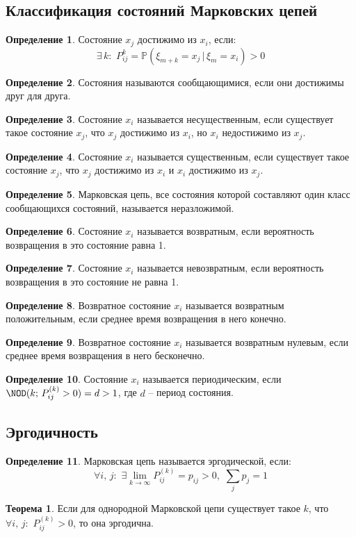 \documentclass[12pt]{article}
\theoremstyle{definition}
\newtheorem{theorem}{Теорема}[section]
\newtheorem{definition}{Определение}
\newcommand{\prob}{\mathbb{P}}
\begin{document}
\subsection{Классификация состояний Марковских цепей}
\begin{definition}
    Состояние $x_j$ достижимо из $x_i$, если:
    $$\exists\,k:\,\,P^k_{ij}=\prob(\xi_{m+k}=x_j\,|\,\xi_m=x_i)>0$$
\end{definition}
\begin{definition}
    Состояния называются сообщающимися, если они достижимы друг для друга.
\end{definition}
\begin{definition}
    Состояние $x_i$ называется несущественным, если существует такое состояние $x_j$, что $x_j$ достижимо из $x_i$, но $x_i$ недостижимо из $x_j$.
\end{definition}
\begin{definition}
    Состояние $x_i$ называется существенным, если существует такое состояние $x_j$, что $x_j$ достижимо из $x_i$ и $x_i$ достижимо из $x_j$.
\end{definition}
\begin{definition}
    Марковская цепь, все состояния которой составляют один класс сообщающихся состояний, называется неразложимой.
\end{definition}
\begin{definition}
    Состояние $x_i$ называется возвратным, если вероятность возвращения в это состояние равна 1.
\end{definition}
\begin{definition}
    Состояние $x_i$ называется невозвратным, если вероятность возвращения в это состояние не равна 1.
\end{definition}
\begin{definition}
    Возвратное состояние $x_i$ называется возвратным положительным, если среднее время возвращения в него конечно.
\end{definition}
\begin{definition}
    Возвратное состояние $x_i$ называется возвратным нулевым, если среднее время возвращения в него бесконечно.
\end{definition}
\begin{definition}
    Состояние $x_i$ называется периодическим, если $\NOD(k;\,P^{(k)}_{ij}>0)=d>1$, где $d$ -- период состояния.
\end{definition}
\subsection{Эргодичность}
\begin{definition}
    Марковская цепь называется эргодической, если:
    $$\forall i,\,j:\,\,\exists\lim_{k\to\infty}P^{(k)}_{ij}=p_{ij}>0,\,\,\sum_{j}p_j=1$$
\end{definition}
\begin{theorem}
    Если для однородной Марковской цепи существует такое $k$, что $\forall i,\,j:\,\,P^{(k)}_{ij}>0$, то она эргодична.
\end{theorem}
\end{document}
